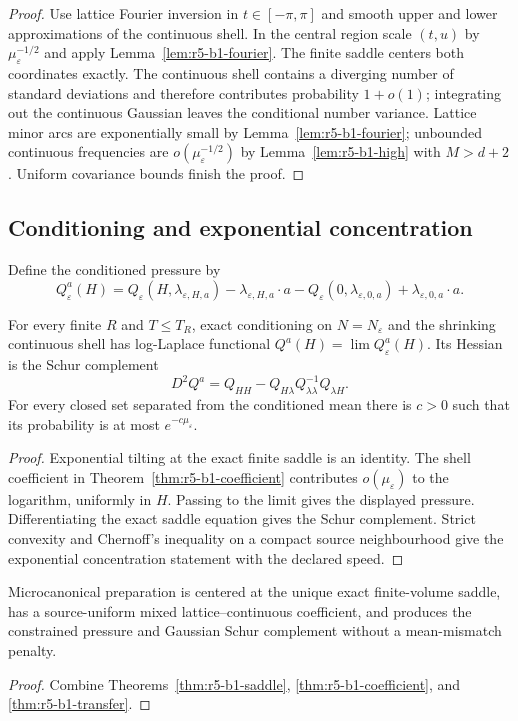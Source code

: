\begin{proof}
Use lattice Fourier inversion in \(t\in[-\pi,\pi]\) and smooth upper and
lower approximations of the continuous shell.  In the central region scale
\((t,u)\) by \(\mu_\varepsilon^{-1/2}\) and apply
Lemma~\ref{lem:r5-b1-fourier}.  The finite saddle centers both coordinates
exactly.  The continuous shell contains a diverging number of standard
deviations and therefore contributes probability \(1+o(1)\); integrating
out the continuous Gaussian leaves the conditional number variance.
Lattice minor arcs are exponentially small by
Lemma~\ref{lem:r5-b1-fourier}; unbounded continuous frequencies are
\(o(\mu_\varepsilon^{-1/2})\) by
Lemma~\ref{lem:r5-b1-high} with \(M>d+2\).  Uniform covariance bounds finish
the proof.
\end{proof}

\subsection{Conditioning and exponential concentration}

Define the conditioned pressure by
\[
 Q_\varepsilon^a(H)
 =
 Q_\varepsilon(H,\lambda_{\varepsilon,H,a})
 -\lambda_{\varepsilon,H,a}\cdot a
 -Q_\varepsilon(0,\lambda_{\varepsilon,0,a})
 +\lambda_{\varepsilon,0,a}\cdot a.
\]

\begin{theorem}
\label{thm:r5-b1-transfer}
For every finite \(R\) and \(T\le T_R\), exact conditioning on
\(N=N_\varepsilon\) and the shrinking continuous shell has log-Laplace
functional \(Q^a(H)=\lim Q_\varepsilon^a(H)\).  Its Hessian is the Schur
complement
\[
 D^2Q^a
 =Q_{HH}-Q_{H\lambda}
  Q_{\lambda\lambda}^{-1}Q_{\lambda H}.
\]
For every closed set separated from the conditioned mean there is \(c>0\)
such that its probability is at most \(e^{-c\mu_\varepsilon}\).
\end{theorem}

\begin{proof}
Exponential tilting at the exact finite saddle is an identity.  The shell
coefficient in Theorem~\ref{thm:r5-b1-coefficient} contributes
\(o(\mu_\varepsilon)\) to the logarithm, uniformly in \(H\).  Passing to the
limit gives the displayed pressure.  Differentiating the exact saddle
equation gives the Schur complement.  Strict convexity and Chernoff's
inequality on a compact source neighbourhood give the exponential
concentration statement with the declared speed.
\end{proof}

\begin{theorem}
\label{thm:r5-b1-main}
Microcanonical preparation is centered at the unique exact finite-volume
saddle, has a source-uniform mixed lattice--continuous coefficient, and
produces the constrained pressure and Gaussian Schur complement without a
mean-mismatch penalty.
\end{theorem}

\begin{proof}
Combine Theorems~\ref{thm:r5-b1-saddle},
\ref{thm:r5-b1-coefficient}, and
\ref{thm:r5-b1-transfer}.
\end{proof}

